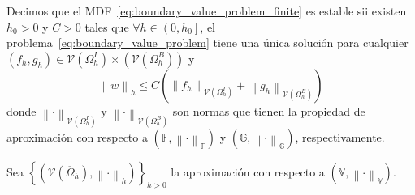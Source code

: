 \begin{definition}[Estabilidad]
    Decimos que el MDF~\eqref{eq:boundary_value_problem_finite} es
    estable sii existen $h_{0}>0$ y $C>0$ tales que
    \begin{math}
        \forall h\in\left(0,h_{0}\right]
    \end{math},
    el problema~\eqref{eq:boundary_value_problem}
    tiene una única solución para cualquier
    \begin{math}
        \left(
        f_{h},g_{h}
        \right)\in
        \mathcal{V}\left(
        \Omega^{I}_{h}
        \right)\times
        \left(
        \mathcal{V}\left(
            \Omega^{B}_{h}
            \right)
        \right)
    \end{math}
    y
    \begin{equation*}
        \left\|w\right\|_{h}\leq
        C\left(
        \left\|f_{h}\right\|_{\mathcal{V}\left(
            \Omega^{I}_{h}
            \right)}+
        \left\|g_{h}\right\|_{\mathcal{V}\left(
            \Omega^{B}_{h}
            \right)}
        \right)
    \end{equation*}
    donde
    \begin{math}
        {\left\|\cdot\right\|}_{\mathcal{V}\left(
            \Omega^{I}_{h}
            \right)}
    \end{math}
    y
    \begin{math}
        {\left\|\cdot\right\|}_{\mathcal{V}\left(
            \Omega^{B}_{h}
            \right)}
    \end{math}
    son normas que tienen la propiedad de aproximación con respecto a
    \begin{math}
        \left(
        \mathbb{F},
        {\left\|\cdot\right\|}_{\mathbb{F}}
        \right)
    \end{math}
    y
    \begin{math}
        \left(
        \mathbb{G},
        {\left\|\cdot\right\|}_{\mathbb{G}}
        \right)
    \end{math},
    respectivamente.
\end{definition}

Sea
\begin{math}
    \left\{
    \left(
    \mathcal{V}\left(\overline{\Omega}_{h}\right),
    \left\|\cdot\right\|_{h}
    \right)
    \right\}_{h>0}
\end{math}
la aproximación con respecto a
\begin{math}
    \left(
    \mathbb{V},
    {\left\|\cdot\right\|}_{\mathbb{V}}
    \right)
\end{math}.

